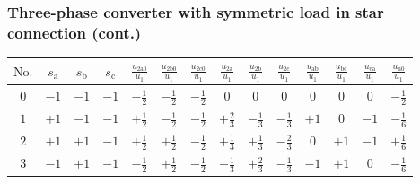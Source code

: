 \begin{frame}[b]
	\frametitle{Three-phase converter with symmetric load in star connection (cont.)}
	\vspace{1em}
	\begin{table}
		\renewcommand{\arraystretch}{1.25}
		\centering
		\begin{tabular}{c c c c c c c c c c c c c c}
			\toprule
			$\mathrm{No.}$ & $s_\mathrm{a}$ & $s_\mathrm{b}$ & $s_\mathrm{c}$ & $\frac{u_{2\mathrm{a}0}}{u_1}$ & $\frac{u_{2\mathrm{b}0}}{u_1}$ & $\frac{u_{2\mathrm{c}0}}{u_1}$ & $\frac{u_{2\mathrm{a}}}{u_1}$ & $\frac{u_{2\mathrm{b}}}{u_1}$ & $\frac{u_{2\mathrm{c}}}{u_1}$ & $\frac{u_{\mathrm{ab}}}{u_1}$ & $\frac{u_{\mathrm{bc}}}{u_1}$ & $\frac{u_{\mathrm{ca}}}{u_1}$ & $\frac{u_{\mathrm{n}0}}{u_1}$ \\
			\midrule
			$0$            & $-1$           & $-1$           & $-1$           & $-\frac{1}{2}$                 & $-\frac{1}{2}$                 & $-\frac{1}{2}$                 & $0$                           & $0$                           & $0$                           & $0$                           & $0$                           & $0$                           & $-\frac{1}{2}$                \\

			$1$            & $+1$           & $-1$           & $-1$           & $+\frac{1}{2}$                 & $-\frac{1}{2}$                 & $-\frac{1}{2}$                 & $+\frac{2}{3}$                & $-\frac{1}{3}$                & $-\frac{1}{3}$                & $+1$                          & $0$                           & $-1$                          & $-\frac{1}{6}$                \\

			$2$            & $+1$           & $+1$           & $-1$           & $+\frac{1}{2}$                 & $+\frac{1}{2}$                 & $-\frac{1}{2}$                 & $+\frac{1}{3}$                & $+\frac{1}{3}$                & $-\frac{2}{3}$                & $0$                           & $+1$                          & $-1$                          & $+\frac{1}{6}$                \\

			$3$            & $-1$           & $+1$           & $-1$           & $-\frac{1}{2}$                 & $+\frac{1}{2}$                 & $-\frac{1}{2}$                 & $-\frac{1}{3}$                & $+\frac{2}{3}$                & $-\frac{1}{3}$                & $-1$                          & $+1$                          & $0$                           & $-\frac{1}{6}$                \\


\end{tabular}
\end{table}
\end{frame}
